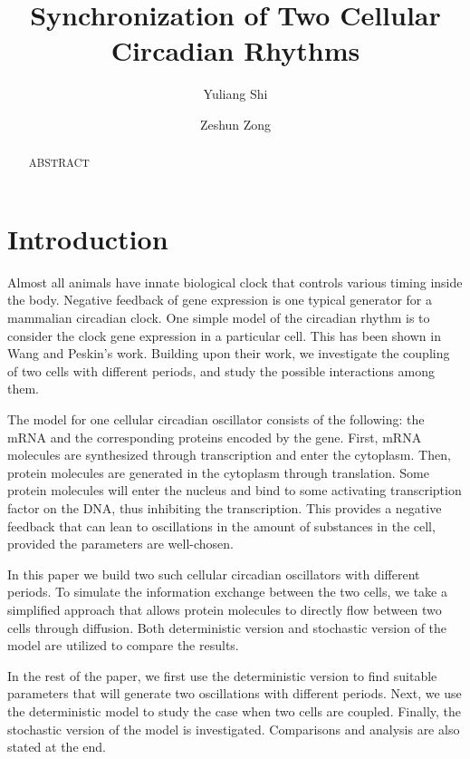 \documentclass[12pt]{article}
\renewcommand{\(}{\left (}
\renewcommand{\)}{\right )}
\begin{document}
\title{Synchronization of Two Cellular Circadian Rhythms}
\date{}
\author[1]{Yuliang Shi}
\author[2]{Zeshun Zong}


\maketitle
\begin{abstract}
ABSTRACT
\end{abstract}

\section{Introduction}

\hspace{5mm} Almost all animals have innate biological clock that controls various timing inside the body. Negative feedback of gene expression is one typical generator for a mammalian circadian clock. One simple model of the circadian rhythm is to consider the clock gene expression in a particular cell. This has been shown in Wang and Peskin's work. Building upon their work, we investigate the coupling of two cells with different periods, and study the possible interactions among them.

The model for one cellular circadian oscillator consists of the following: the mRNA and the corresponding proteins encoded by the gene. First, mRNA molecules are synthesized through transcription and enter the cytoplasm. Then, protein molecules are generated in the cytoplasm through translation. Some protein molecules will enter the nucleus and bind to some activating transcription factor on the DNA, thus inhibiting the transcription. This provides a negative feedback that can lean to oscillations in the amount of substances in the cell, provided the parameters are well-chosen.

In this paper we build two such cellular circadian oscillators with different periods. To simulate the information exchange between the two cells, we take a simplified approach that allows protein molecules to directly flow between two cells through diffusion. Both deterministic version and stochastic version of the model are utilized to compare the results.

In the rest of the paper, we first use the deterministic version to find suitable parameters that will generate two oscillations with different periods. Next, we use the deterministic model to study the case when two cells are coupled. Finally, the stochastic version of the model is investigated. Comparisons and analysis are also stated at the end.
\end{document}
